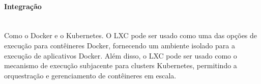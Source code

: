\paragraph*{Integração}\mbox{}\\
  Como o Docker e o Kubernetes. O LXC pode ser usado como uma das opções de execução para contêineres Docker, fornecendo um ambiente isolado para a execução de aplicativos Docker. Além disso, o LXC pode ser usado como o mecanismo de execução subjacente para clusters Kubernetes, permitindo a orquestração e gerenciamento de contêineres em escala.